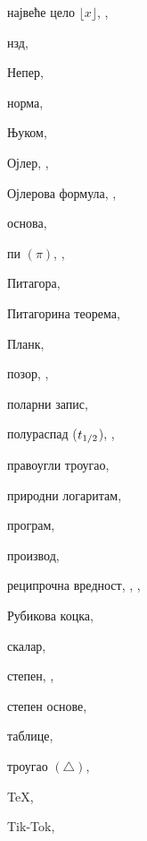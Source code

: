 \begin{theindex}
  \indexspace

  \item највеће цело $\lfloor x\rfloor$, , 
  \item нзд, 
  \item Непер, 
  \item норма, 

  \indexspace

  \item Њуком, 

  \indexspace

  \item Ојлер, , 
  \item Ојлерова формула, , 
  \item основа, 

  \indexspace

  \item пи $(\pi)$, , 
  \item Питагора, 
  \item Питагорина теорема, 
  \item Планк, 
  \item позор, , 
  \item поларни запис, 
  \item полураспад ($t_{1/2}$), , 
  \item правоугли троугао, 
  \item природни логаритам, 
  \item програм, 
  \item производ, 

  \indexspace

  \item реципрочна вредност, , 
		, 
  \item Рубикова коцка, 

  \indexspace

  \item скалар, 
  \item степен, , 
  \item степен основе, 

  \indexspace

  \item таблице, 
  \item троугао $(\triangle )$, 
  \interskip
  \item \TeX, 
  \item Tik-Tok, 


\end{theindex}

